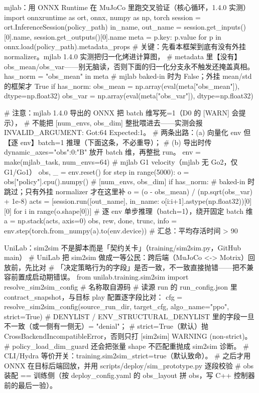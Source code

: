 \begin{codebox}[Python]{mjlab：用 ONNX Runtime 在 MuJoCo 里跑交叉验证（核心循环，1.4.0 实测）}
import onnxruntime as ort, onnx, numpy as np, torch
session = ort.InferenceSession(policy_path)
in_name, out_name = session.get_inputs()[0].name, session.get_outputs()[0].name
meta = {p.key: p.value for p in onnx.load(policy_path).metadata_props}
# 关键：先看本框架到底有没有外挂 normalizer。mjlab 1.4.0 实测把归一化烤进计算图，
#   metadata 里【没有】obs_mean/obs_var——别无脑读，否则下面的归一化分支永不触发还掩盖真相。
has_norm = "obs_mean" in meta                  # mjlab baked-in 时为 False；外挂 mean/std 的框架才 True
if has_norm:
    obs_mean = np.array(eval(meta["obs_mean"]), dtype=np.float32)
    obs_var  = np.array(eval(meta["obs_var"]),  dtype=np.float32)

# 注意：mjlab 1.4.0 导出的 ONNX 把 batch 维写死=1（D0 的 [WARN] 会提示），
#   不能把 [num_envs, obs_dim] 整批喂进去——实测会报 INVALID_ARGUMENT: Got:64 Expected:1。
#   两条出路：(a) 向量化 env 但【逐 env】batch=1 推理（下面这条，不必重导）；
#            (b) 导出时传 dynamic_axes={"obs":{0:"B"}} 放开 batch 维，再整批 run。
env = make(mjlab_task, num_envs=64)            # mjlab G1 velocity（mjlab 无 Go2，仅 G1/Go1）
obs, _ = env.reset()
for step in range(5000):
    o = obs["policy"].cpu().numpy()            # [num_envs, obs_dim]
    if has_norm:                               # baked-in 时跳过；只有外挂 normalizer 才在这里补
        o = (o - obs_mean) / (np.sqrt(obs_var) + 1e-8)
    acts = [session.run([out_name], {in_name: o[i:i+1].astype(np.float32)})[0][0]
            for i in range(o.shape[0])]        # 逐 env 单步推理（batch=1），绕开固定 batch 维
    a = np.stack(acts, axis=0)
    obs, rew, done, trunc, info = env.step(torch.from_numpy(a).to(env.device))
# 汇总：平均存活时间 > 90%
\end{codebox}

\begin{codebox}[Python]{UniLab：sim2sim 不是脚本而是「契约关卡」（training/sim2sim.py，GitHub main）}
# UniLab 把 sim2sim 做成一等公民：跨后端（MuJoCo <-> Motrix）回放前，先比对
# 「决定策略行为的字段」是否一致，不一致直接抛错——把不兼容前置成启动期错误。
from unilab.training.sim2sim import resolve_sim2sim_config  # 名称取自源码
# 读源 run 的 run_config.json 里 contract_snapshot，与目标 play 配置逐字段比对：
cfg = resolve_sim2sim_config(source_run_dir, target_cfg, algo_name="ppo", strict=True)
#   DENYLIST / ENV_STRUCTURAL_DENYLIST 里的字段一旦不一致（或一侧有一侧无）= "denial"；
#   strict=True（默认）抛 CrossBackendIncompatibleError，否则只打 [sim2sim] WARNING (non-strict)。
#   policy_load_dim_guard 还会把张量 shape 不匹配重抛成 sim2sim 诊断。
# CLI/Hydra 等价开关：training.sim2sim_strict=true（默认致命）。
# 之后才用 ONNX 在目标后端回放，并用 scripts/deploy/sim_prototype.py 逐段校验
#   obs 装配 == 训练侧（按 deploy_config.yaml 的 obs_layout 拼 obs，写 C++ 控制器前的最后一验）。
\end{codebox}

